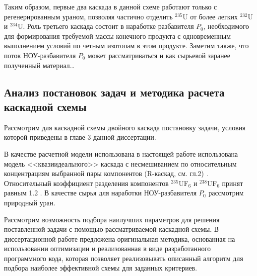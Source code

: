 Таким образом, первые два каскада в данной схеме работают только с регенерированным ураном, позволяя частично отделить $^{235}$U от более легких $^{232}$U и $^{234}$U. Роль третьего каскада состоит в наработке разбавителя $P_{0}$, необходимого для формирования требуемой массы конечного продукта с одновременным выполнением условий по четным изотопам в этом продукте. Заметим также, что поток НОУ-разбавителя $P_{0}$ может рассматриваться и как сырьевой заранее полученный материал\dots


\subsection{Анализ постановок задач и методика расчета каскадной схемы} 

Рассмотрим для каскадной схемы двойного каскада постановку задачи, условия которой приведены в главе 3 данной диссертации.

В качестве расчетной модели использована в настоящей работе использована модель <<квазиидеального>> каскада \cite{sazykinKvaziidealnyeKaskadyDlya2000} с несмешиванием по относительным концентрациям выбранной пары компонентов (R-каскад, см. гл.2) \cite{delagarzaMulticomponentIsotopeSeparation1961}. Относительный коэффициент разделения компонентов $^{235}$UF$_{6}$ и $^{238}$UF$_{6}$ принят равным 1.2 \cite{smirnovKaskadnyeShemyZadachah2012}. В качестве сырья для наработки НОУ-разбавителя $P_{0}$ рассмотрим природный уран.


Рассмотрим возможность подбора наилучших параметров для решения поставленной задачи с помощью рассматриваемой каскадной схемы.
В диссертационной работе предложена оригинальная методика, основанная на использовании оптимизации и реализованная в виде разработанного программного кода, которая позволяет реализовывать описанный алгоритм для подбора наиболее эффективной схемы для заданных критериев.

